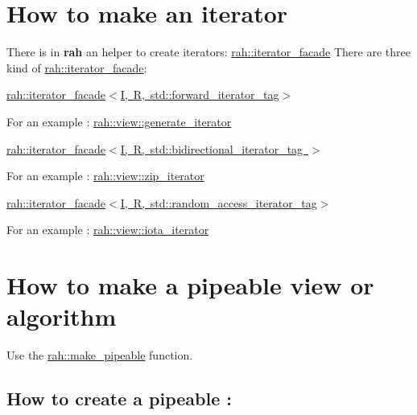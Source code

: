 \section*{How to make an iterator}

There is in {\bfseries{rah}} an helper to create iterators\+: {\ttfamily \mbox{\hyperlink{structrah_1_1iterator__facade}{rah\+::iterator\+\_\+facade}}} There are three kind of {\ttfamily \mbox{\hyperlink{structrah_1_1iterator__facade}{rah\+::iterator\+\_\+facade}}}\+:
\begin{DoxyItemize}
\item \mbox{\hyperlink{structrah_1_1iterator__facade_3_01_i_00_01_r_00_01std_1_1forward__iterator__tag_01_4}{rah\+::iterator\+\_\+facade$<$\+I, R, std\+::forward\+\_\+iterator\+\_\+tag$>$}}
\begin{DoxyItemize}
\item For an example \+: \mbox{\hyperlink{structrah_1_1view_1_1generate__iterator}{rah\+::view\+::generate\+\_\+iterator}}
\end{DoxyItemize}
\item \mbox{\hyperlink{structrah_1_1iterator__facade_3_01_i_00_01_r_00_01std_1_1bidirectional__iterator__tag_01_4}{rah\+::iterator\+\_\+facade$<$\+I, R, std\+::bidirectional\+\_\+iterator\+\_\+tag $>$}}
\begin{DoxyItemize}
\item For an example \+: \mbox{\hyperlink{structrah_1_1view_1_1zip__iterator}{rah\+::view\+::zip\+\_\+iterator}}
\end{DoxyItemize}
\item \mbox{\hyperlink{structrah_1_1iterator__facade_3_01_i_00_01_r_00_01std_1_1random__access__iterator__tag_01_4}{rah\+::iterator\+\_\+facade$<$\+I, R, std\+::random\+\_\+access\+\_\+iterator\+\_\+tag$>$}}
\begin{DoxyItemize}
\item For an example \+: \mbox{\hyperlink{structrah_1_1view_1_1iota__iterator}{rah\+::view\+::iota\+\_\+iterator}}
\end{DoxyItemize}
\end{DoxyItemize}

\section*{How to make a pipeable view or algorithm}

Use the \mbox{\hyperlink{namespacerah_a9beb2a94a054fd0caefd5a20b1c0f0d9}{rah\+::make\+\_\+pipeable}} function. \subsection*{How to create a pipeable \+:}


